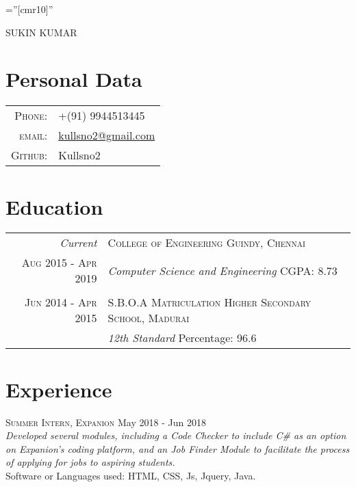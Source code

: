 \documentclass[a4paper,10pt]{article}
\begin{document}

\pagestyle{empty} %

\font\fb=''[cmr10]'' %

\par{\centering
		{\Huge SUKIN \textsc{KUMAR}
	}\bigskip\par}

\section{Personal Data}

\begin{tabular}{rl}
    \textsc{Phone:}     & +(91) 9944513445\\
    \textsc{email:}     &
    \href{mailto:kullsno2@gmail.com}{kullsno2@gmail.com}\\
    \textsc{Github:}    & Kullsno2
\end{tabular}

\section{Education}
\begin{tabular}{r|p{11cm}}
 \emph{Current} & \textsc{College of Engineering Guindy, Chennai}\\\textsc{Aug 2015 - Apr 2019}&\emph{Computer Science and Engineering} \qquad \qquad \qquad \qquad \quad \hspace*{\fill} CGPA: 8.73\\{} \multicolumn{2}{c}{} \\
 \textsc{Jun 2014 - Apr 2015} & \textsc{S.B.O.A Matriculation Higher Secondary School, Madurai}\\ &\emph{12th Standard}    \hfill Percentage: 96.6\multicolumn{2}{c}{}
\end{tabular}
\section{Experience}
{\textsc{Summer Intern, Expanion} \hfill May 2018 - Jun 2018 \\
\emph{Developed several modules, including a Code Checker to include C# as an option on Expanion's coding platform, and an Job Finder Module to facilitate the process of applying for jobs to aspiring students.}\\
Software or Languages used: HTML, CSS, Js, Jquery, Java.} \\
\end{document}
